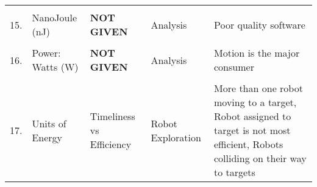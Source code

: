 \begin{table}[h]
\begin{tabular}{p{0.1cm}p{3cm}p{4cm}p{4cm}p{4cm}}
            \hline
            \\
            {15.} &
                {NanoJoule (nJ)} &
                {\textbf{NOT GIVEN}} &
                {Analysis} &
                {Poor quality software} \\
            \hline
            \\
            {16.} &
                {Power: Watts (W)} &
                {\textbf{NOT GIVEN}} &
                {Analysis} &
                {Motion is the major consumer} \\
            \hline
            \\
            {17.} &
                {Units of Energy} &
                {Timeliness vs Efficiency} &
                {Robot Exploration} &
                {More than one robot moving to a target, 
                Robot assigned to target is not most efficient,
                Robots colliding on their way to targets} \\
        \bottomrule
    \end{tabular}
    \label{table:data_sheet_part_1}
\end{table}